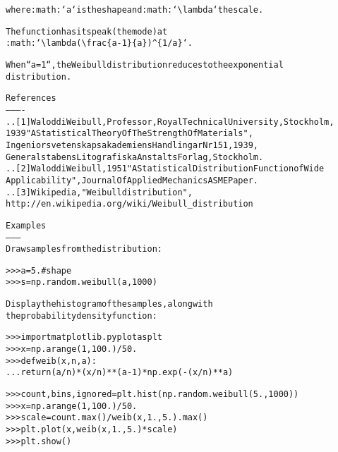 \begin{boxedminipage}{\funcwidth}
\begin{alltt}
where :math:`a` is the shape and :math:`{\textbackslash}lambda` the scale.

The function has its peak (the mode) at
:math:`{\textbackslash}lambda({\textbackslash}frac\{a-1\}\{a\}){\textasciicircum}\{1/a\}`.

When ``a = 1``, the Weibull distribution reduces to the exponential
distribution.

References
----------
.. [1] Waloddi Weibull, Professor, Royal Technical University, Stockholm,
       1939 "A Statistical Theory Of The Strength Of Materials",
       Ingeniorsvetenskapsakademiens Handlingar Nr 151, 1939,
       Generalstabens Litografiska Anstalts Forlag, Stockholm.
.. [2] Waloddi Weibull, 1951 "A Statistical Distribution Function of Wide
       Applicability",  Journal Of Applied Mechanics ASME Paper.
.. [3] Wikipedia, "Weibull distribution",
       http://en.wikipedia.org/wiki/Weibull\_distribution

Examples
--------
Draw samples from the distribution:

{\textgreater}{\textgreater}{\textgreater} a = 5. \# shape
{\textgreater}{\textgreater}{\textgreater} s = np.random.weibull(a, 1000)

Display the histogram of the samples, along with
the probability density function:

{\textgreater}{\textgreater}{\textgreater} import matplotlib.pyplot as plt
{\textgreater}{\textgreater}{\textgreater} x = np.arange(1,100.)/50.
{\textgreater}{\textgreater}{\textgreater} def weib(x,n,a):
...     return (a / n) * (x / n)**(a - 1) * np.exp(-(x / n)**a)

{\textgreater}{\textgreater}{\textgreater} count, bins, ignored = plt.hist(np.random.weibull(5.,1000))
{\textgreater}{\textgreater}{\textgreater} x = np.arange(1,100.)/50.
{\textgreater}{\textgreater}{\textgreater} scale = count.max()/weib(x, 1., 5.).max()
{\textgreater}{\textgreater}{\textgreater} plt.plot(x, weib(x, 1., 5.)*scale)
{\textgreater}{\textgreater}{\textgreater} plt.show()
\end{alltt}

\setlength{\parskip}{1ex}
    \end{boxedminipage}

    \label{QSTK:qstklearn:mldiagnostics:zipf}

    \vspace{0.5ex}

